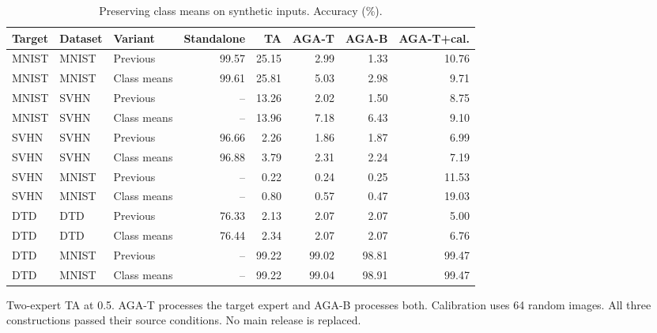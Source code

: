 \begin{table}[t]
\centering\small
\setlength{\tabcolsep}{4pt}
\caption{Preserving class means on synthetic inputs. Accuracy (\%).}
\label{tab:defense2_native_means}
\begin{tabular}{@{}lllrrrrr@{}}
\toprule
Target & Dataset & Variant & Standalone & TA & AGA-T & AGA-B & AGA-T+cal. \\
\midrule
MNIST & MNIST & Previous & 99.57 & 25.15 & 2.99 & 1.33 & 10.76 \\
MNIST & MNIST & Class means & 99.61 & 25.81 & 5.03 & 2.98 & 9.71 \\
MNIST & SVHN & Previous & -- & 13.26 & 2.02 & 1.50 & 8.75 \\
MNIST & SVHN & Class means & -- & 13.96 & 7.18 & 6.43 & 9.10 \\
\midrule
SVHN & SVHN & Previous & 96.66 & 2.26 & 1.86 & 1.87 & 6.99 \\
SVHN & SVHN & Class means & 96.88 & 3.79 & 2.31 & 2.24 & 7.19 \\
SVHN & MNIST & Previous & -- & 0.22 & 0.24 & 0.25 & 11.53 \\
SVHN & MNIST & Class means & -- & 0.80 & 0.57 & 0.47 & 19.03 \\
\midrule
DTD & DTD & Previous & 76.33 & 2.13 & 2.07 & 2.07 & 5.00 \\
DTD & DTD & Class means & 76.44 & 2.34 & 2.07 & 2.07 & 6.76 \\
DTD & MNIST & Previous & -- & 99.22 & 99.02 & 98.81 & 99.47 \\
DTD & MNIST & Class means & -- & 99.22 & 99.04 & 98.91 & 99.47 \\
\bottomrule
\end{tabular}
\par\smallskip
\begin{minipage}{\textwidth}\footnotesize Two-expert TA at 0.5. AGA-T processes the target expert and AGA-B processes both. Calibration uses 64 random images. All three constructions passed their source conditions. No main release is replaced.\end{minipage}
\end{table}
